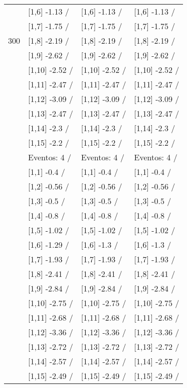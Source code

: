 \begin{table}
\begin{tabular}[t]{llll}
 & {}[1,6] -1.13  / & {}[1,6] -1.13  / & {}[1,6] -1.13  /\\
 & {}[1,7] -1.75  / & {}[1,7] -1.75  / & {}[1,7] -1.75  /\\
300 & {}[1,8] -2.19  / & {}[1,8] -2.19  / & {}[1,8] -2.19  /\\
\addlinespace
 & {}[1,9] -2.62  / & {}[1,9] -2.62  / & {}[1,9] -2.62  /\\
 & {}[1,10] -2.52  / & {}[1,10] -2.52  / & {}[1,10] -2.52  /\\
 & {}[1,11] -2.47  / & {}[1,11] -2.47  / & {}[1,11] -2.47  /\\
 & {}[1,12] -3.09  / & {}[1,12] -3.09  / & {}[1,12] -3.09  /\\
 & {}[1,13] -2.47  / & {}[1,13] -2.47  / & {}[1,13] -2.47  /\\
\addlinespace
 & {}[1,14] -2.3  / & {}[1,14] -2.3  / & {}[1,14] -2.3  /\\
 & {}[1,15] -2.2  / & {}[1,15] -2.2  / & {}[1,15] -2.2  /\\
 & Eventos:  4 / & Eventos:  4 / & Eventos:  4 /\\
 & {}[1,1] -0.4  / & {}[1,1] -0.4  / & {}[1,1] -0.4  /\\
 & {}[1,2] -0.56  / & {}[1,2] -0.56  / & {}[1,2] -0.56  /\\
\addlinespace
 & {}[1,3] -0.5  / & {}[1,3] -0.5  / & {}[1,3] -0.5  /\\
 & {}[1,4] -0.8  / & {}[1,4] -0.8  / & {}[1,4] -0.8  /\\
 & {}[1,5] -1.02  / & {}[1,5] -1.02  / & {}[1,5] -1.02  /\\
 & {}[1,6] -1.29  / & {}[1,6] -1.3  / & {}[1,6] -1.3  /\\
 & {}[1,7] -1.93  / & {}[1,7] -1.93  / & {}[1,7] -1.93  /\\
\addlinespace
500 & {}[1,8] -2.41  / & {}[1,8] -2.41  / & {}[1,8] -2.41  /\\
 & {}[1,9] -2.84  / & {}[1,9] -2.84  / & {}[1,9] -2.84  /\\
 & {}[1,10] -2.75  / & {}[1,10] -2.75  / & {}[1,10] -2.75  /\\
 & {}[1,11] -2.68  / & {}[1,11] -2.68  / & {}[1,11] -2.68  /\\
 & {}[1,12] -3.36  / & {}[1,12] -3.36  / & {}[1,12] -3.36  /\\
\addlinespace
 & {}[1,13] -2.72  / & {}[1,13] -2.72  / & {}[1,13] -2.72  /\\
 & {}[1,14] -2.57  / & {}[1,14] -2.57  / & {}[1,14] -2.57  /\\
 & {}[1,15] -2.49  / & {}[1,15] -2.49  / & {}[1,15] -2.49  /\\
\bottomrule
\end{tabular}
\end{table}
